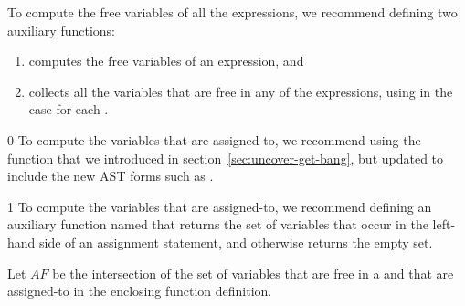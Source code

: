 \documentclass[7x10]{TimesAPriori_MIT}%
\def\racketEd{0}
\def\pythonEd{1}
\def\edition{0}
\numberwithin{theorem}{chapter}
\numberwithin{definition}{chapter}
\numberwithin{equation}{chapter}
\begin{document}
To compute the free variables of all the  expressions, we
recommend defining two auxiliary functions:
\begin{enumerate}
\item {} computes the free variables of an expression, and
\item {} collects all the variables that are
  free in any of the  expressions, using
   in the case for each .
\end{enumerate}


{\if\edition\racketEd
%
To compute the variables that are assigned-to, we recommend using the
 function that we introduced in
section~\ref{sec:uncover-get-bang}, but updated to include the new AST
forms such as .
%
\fi}
  
{\if\edition\pythonEd
%
To compute the variables that are assigned-to, we recommend defining
an auxiliary function named  that returns
the set of variables that occur in the left-hand side of an assignment
statement, and otherwise returns the empty set.
%
\fi}

Let $\mathit{AF}$ be the intersection of the set of variables that are
free in a  and that are assigned-to in the enclosing
function definition.
\end{document}
